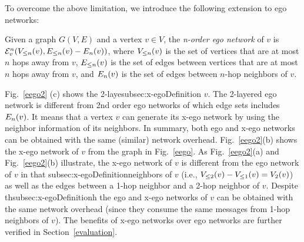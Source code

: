 To overcome the above limitation, we introduce the following extension to ego networks:
\begin{definition}\label{def:multi-order-network}
Given a graph $G(V, E)$ and a vertex $v \in V$, the \emph{n-order ego network} of $v$ is $\ENN{v}{n}(\LV{v}{n}, \LE{v}{n} - \E{v}{n})$, where $\LV{v}{n}$ is the set of vertices that are at most $n$ hops away from $v$, $\LE{v}{n}$ is the set of edges between vertices that are at most $n$ hops away from $v$, and $\E{v}{n}$ is the set of edges between $n$-hop neighbors of $v$.
\end{definition}
Fig.~\ref{eego2} (c) shows the 2-laye{subsec:x-egoDefinition} $v$. The 2-layered ego network is different from 2nd order ego networks of which edge sets includes $\E{v}{n}$.
It means that a vertex $v$ can generate its x-ego network by using the neighbor information of its neighbors. In summary, both ego and x-ego networks can be obtained with the same (similar) network overhead.
Fig.~\ref{eego2}(b) shows the x-ego network of $v$ from the graph in Fig.~\ref{eego}.
As Fig.~\ref{eego2}(a) and Fig.~\ref{eego2}(b) illustrate, the x-ego network of $v$ is different from the ego network of $v$ in that {subsec:x-egoDefinition}neighbors of $v$ (i.e., $\LV{v}{2} - \LV{v}{1} = \V{v}{2}$) as well as the edges between a 1-hop neighbor and a 2-hop neighbor of $v$.
Despite th{subsec:x-egoDefinition}h the ego and x-ego networks of $v$ can be obtained with the same network overhead (since they consume the same messages from 1-hop neighbors of $v$).
The benefits of x-ego networks over ego networks are further verified in Section~\ref{evaluation}.
